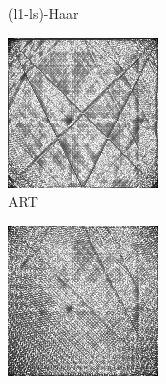 \documentclass[journal]{IEEEtran}
\begin{document}
\begin{figure}[!h]
\begin{subfigure}[b]{0.24\linewidth}
        \caption{(l1-ls)-Haar}
     \end{subfigure}
    \begin{subfigure}[b]{0.24\linewidth}
        \includegraphics[width=\textwidth]{../images/potato/post_tci/comparison/weightsIm_art30.png}
        \caption{ART}
     \end{subfigure}
    \begin{subfigure}[b]{0.24\linewidth}
        \includegraphics[width=\textwidth]{../images/potato/post_tci/comparison/weightsIm_sart30.png}

\end{subfigure}
\end{figure}
\end{document}
